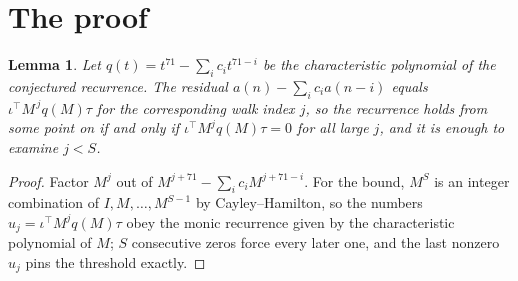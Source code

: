 \documentclass[11pt,a4paper]{article}
\theoremstyle{plain}
\newtheorem{lemma}[theorem]{Lemma}
\theoremstyle{definition}
\begin{document}
\section{The proof}

\begin{lemma}\label{lem:crit}
Let $q(t)=t^{71}-\sum_i c_it^{71-i}$ be the characteristic polynomial of the
conjectured recurrence. The residual $a(n)-\sum_ic_ia(n-i)$ equals
$\iota^{\!\top}M^{\,j}q(M)\tau$ for the corresponding walk index $j$, so the recurrence
holds from some point on if and only if $\iota^{\!\top}M^{j}q(M)\tau=0$ for all large $j$,
and it is enough to examine $j<S$.
\end{lemma}

\begin{proof}
Factor $M^{j}$ out of $M^{j+71}-\sum_ic_iM^{j+71-i}$. For the bound, $M^{S}$
is an integer combination of $I,M,\dots,M^{S-1}$ by Cayley--Hamilton, so the numbers
$u_j=\iota^{\!\top}M^{j}q(M)\tau$ obey the monic recurrence given by the characteristic
polynomial of $M$; $S$ consecutive zeros force every later one, and the last nonzero $u_j$
pins the threshold exactly.
\end{proof}
\end{document}
